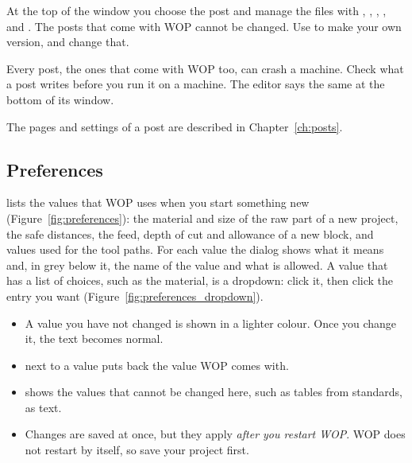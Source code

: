 At the top of the window you choose the post and manage the files with , , , ,  and . The posts that come with WOP cannot be changed. Use  to make your own version, and change that.

\begin{warningbox}
Every post, the ones that come with WOP too, can crash a machine. Check what a post writes before you run it on a machine. The editor says the same at the bottom of its window.
\end{warningbox}

The pages and settings of a post are described in Chapter~\ref{ch:posts}.

\subsection{Preferences}\label{sec:file:preferences}
 lists the values that WOP uses when you start something new (Figure~\ref{fig:preferences}): the material and size of the raw part of a new project, the safe distances, the feed, depth of cut and allowance of a new block, and values used for the tool paths. For each value the dialog shows what it means and, in grey below it, the name of the value and what is allowed. A value that has a list of choices, such as the material, is a dropdown: click it, then click the entry you want (Figure~\ref{fig:preferences_dropdown}).



\begin{itemize}
  \item A value you have not changed is shown in a lighter colour. Once you change it, the text becomes normal.
  \item {} next to a value puts back the value WOP comes with.
  \item {} shows the values that cannot be changed here, such as tables from standards, as text.
  \item Changes are saved at once, but they apply \emph{after you restart WOP}. WOP does not restart by itself, so save your project first.
\end{itemize}

